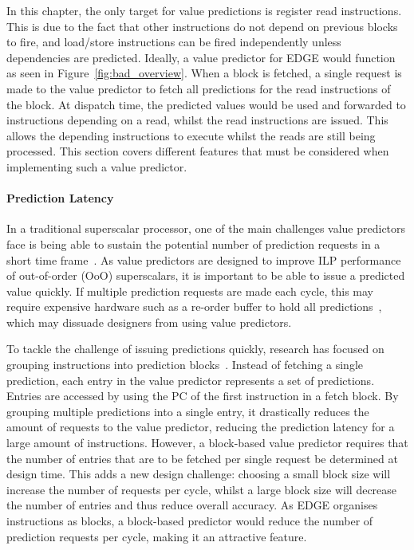 In this chapter, the only target for value predictions is register read instructions.
This is due to the fact that other instructions do not depend on previous blocks to fire, and load/store instructions can be fired independently unless dependencies are predicted.
Ideally, a value predictor for EDGE would function as seen in Figure~\ref{fig:bad_overview}.
When a block is fetched, a single request is made to the value predictor to fetch all predictions for the read instructions of the block.
At dispatch time, the predicted values would be used and forwarded to instructions depending on a read, whilst the read instructions are issued.
This allows the depending instructions to execute whilst the reads are still being processed.
This section covers different features that must be considered when implementing such a value predictor.


\paragraph*{Prediction Latency}
In a traditional superscalar processor, one of the main challenges value predictors face is being able to sustain the potential number of prediction requests in a short time frame~\cite{peraisBeBop2015}.
As value predictors are designed to improve ILP performance of out-of-order (OoO) superscalars, it is important to be able to issue a predicted value quickly.
If multiple prediction requests are made each cycle, this may require expensive hardware such as a re-order buffer to hold all predictions~\cite{peraisBeBop2015}, which may dissuade designers from using value predictors.

To tackle the challenge of issuing predictions quickly, research has focused on grouping instructions into prediction blocks~\cite{peraisBeBop2015}.
Instead of fetching a single prediction, each entry in the value predictor represents a set of predictions.
Entries are accessed by using the PC of the first instruction in a fetch block.
By grouping multiple predictions into a single entry, it drastically reduces the amount of requests to the value predictor, reducing the prediction latency for a large amount of instructions.
However, a block-based value predictor requires that the number of entries that are to be fetched per single request be determined at design time.
This adds a new design challenge: choosing a small block size will increase the number of requests per cycle, whilst a large block size will decrease the number of entries and thus reduce overall accuracy.
As EDGE organises instructions as blocks, a block-based predictor would reduce the number of prediction requests per cycle, making it an attractive feature.

